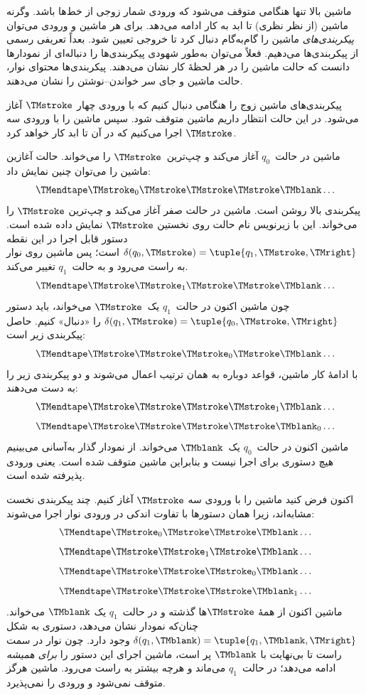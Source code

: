 \documentclass[../../../include/open-logic-section]{subfiles}
\begin{document}
\begin{explain}
ماشین بالا تنها هنگامی متوقف می‌شود که ورودی شمار زوجی از خط‌ها باشد.
وگرنه ماشین (از نظر نظری) تا ابد به کار ادامه می‌دهد. برای هر ماشین و
ورودی می‌توان \emph{پیکربندی‌های} ماشین را گام‌به‌گام دنبال کرد تا
خروجی تعیین شود. بعداً تعریفی رسمی از پیکربندی‌ها می‌دهیم. فعلاً
می‌توان به‌طور شهودی پیکربندی‌ها را دنباله‌ای از نمودارها دانست که
حالت ماشین را در هر لحظهٔ کار نشان می‌دهند. پیکربندی‌ها محتوای نوار،
حالت ماشین و جای سر خواندن--نوشتن را نشان می‌دهند.

پیکربندی‌های ماشین زوج را هنگامی دنبال کنیم که با ورودی چهار
$\TMstroke$ آغاز می‌شود. در این حالت انتظار داریم ماشین متوقف شود.
سپس ماشین را با ورودی سه $\TMstroke$ اجرا می‌کنیم که در آن تا ابد
کار خواهد کرد.

ماشین در حالت~$q_0$ آغاز می‌کند و چپ‌ترین~$\TMstroke$ را می‌خواند.
حالت آغازین ماشین را می‌توان چنین نمایش داد:
\[
\TMendtape \TMstroke_0 \TMstroke \TMstroke \TMstroke \TMblank \ldots
\]
پیکربندی بالا روشن است. ماشین در حالت صفر آغاز می‌کند و چپ‌ترین
$\TMstroke$ را می‌خواند. این با زیرنویس نام حالت روی نخستین
$\TMstroke$ نمایش داده شده است. دستور قابل اجرا در این نقطه
$\delta(q_0,\TMstroke)=\tuple{q_1,\TMstroke,\TMright}$ است؛ پس ماشین
روی نوار به راست می‌رود و به حالت~$q_1$ تغییر می‌کند.
\[
\TMendtape \TMstroke \TMstroke_1 \TMstroke \TMstroke \TMblank \ldots
\]
چون ماشین اکنون در حالت~$q_1$ یک~$\TMstroke$ می‌خواند، باید دستور
$\delta(q_1,\TMstroke)=\tuple{q_0,\TMstroke,\TMright}$ را «دنبال»
کنیم. حاصل پیکربندی زیر است:
\[
\TMendtape \TMstroke \TMstroke \TMstroke_0 \TMstroke \TMblank \ldots
\]
با ادامهٔ کار ماشین، قواعد دوباره به همان ترتیب اعمال می‌شوند و دو
پیکربندی زیر را به دست می‌دهند:
\[
\TMendtape \TMstroke \TMstroke \TMstroke \TMstroke_1 \TMblank \ldots
\]
\[
\TMendtape \TMstroke \TMstroke \TMstroke \TMstroke \TMblank_0 \ldots
\]
ماشین اکنون در حالت~$q_0$ یک~$\TMblank$ می‌خواند. از نمودار گذار
به‌آسانی می‌بینیم هیچ دستوری برای اجرا نیست و بنابراین ماشین متوقف
شده است. یعنی ورودی پذیرفته شده است.

اکنون فرض کنید ماشین را با ورودی سه $\TMstroke$ آغاز کنیم. چند
پیکربندی نخست مشابه‌اند، زیرا همان دستورها با تفاوت اندکی در ورودی
نوار اجرا می‌شوند:
\[
\TMendtape \TMstroke_0 \TMstroke \TMstroke \TMblank \ldots
\]
\[
\TMendtape \TMstroke \TMstroke_1 \TMstroke \TMblank \ldots
\]
\[
\TMendtape \TMstroke \TMstroke \TMstroke_0 \TMblank \ldots
\]
\[
\TMendtape \TMstroke \TMstroke \TMstroke \TMblank_1 \ldots
\]
ماشین اکنون از همهٔ $\TMstroke$ها گذشته و در حالت~$q_1$ یک
$\TMblank$ می‌خواند. چنان‌که نمودار نشان می‌دهد، دستوری به شکل
$\delta(q_1,\TMblank)=\tuple{q_1,\TMblank,\TMright}$ وجود دارد. چون
نوار در سمت راست تا بی‌نهایت با $\TMblank$ پر است، ماشین اجرای این
دستور را \emph{برای همیشه} ادامه می‌دهد؛ در حالت~$q_1$ می‌ماند و
هرچه بیشتر به راست می‌رود. ماشین هرگز متوقف نمی‌شود و ورودی را
نمی‌پذیرد.
\end{explain}
\end{document}
